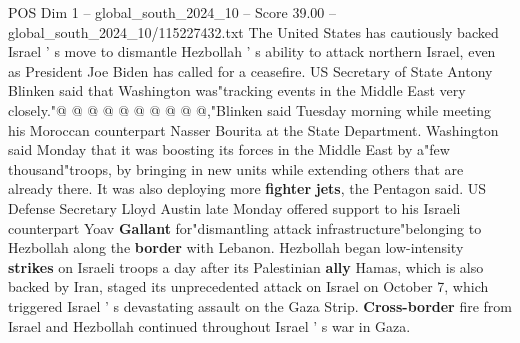 \begin{textsample}{POS Dim 1 – global\_south\_2024\_10 – Score 39.00 – global\_south\_2024\_10/115227432.txt}
The United States has cautiously backed Israel ' s move to dismantle Hezbollah ' s ability to attack northern Israel, even as President Joe Biden has called for a ceasefire.
US Secretary of State Antony Blinken said that Washington was"tracking events in the Middle East very closely."@ @ @ @ @ @ @ @ @ @,"Blinken said Tuesday morning while meeting his Moroccan counterpart Nasser Bourita at the State Department.
Washington said Monday that it was boosting its forces in the Middle East by a"few thousand"troops, by bringing in new units while extending others that are already there.
It was also deploying more \textbf{fighter} \textbf{jets}, the Pentagon said.
US Defense Secretary Lloyd Austin late Monday offered support to his Israeli counterpart Yoav \textbf{Gallant} for"dismantling attack infrastructure"belonging to Hezbollah along the \textbf{border} with Lebanon.
Hezbollah began low-intensity \textbf{strikes} on Israeli troops a day after its Palestinian \textbf{ally} Hamas, which is also backed by Iran, staged its unprecedented attack on Israel on October 7, which triggered Israel ' s devastating assault on the Gaza Strip. \textbf{Cross-border} fire from Israel and Hezbollah continued throughout Israel ' s war in Gaza.

\end{textsample}

